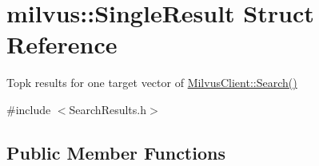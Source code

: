\hypertarget{structmilvus_1_1_single_result}{}\section{milvus\+:\+:Single\+Result Struct Reference}
\label{structmilvus_1_1_single_result}


Topk results for one target vector of \hyperlink{classmilvus_1_1_milvus_client_a46c70fc2b7c386003babd90e02b299d1}{Milvus\+Client\+::\+Search()}  




{\ttfamily \#include $<$Search\+Results.\+h$>$}

\subsection*{Public Member Functions}
